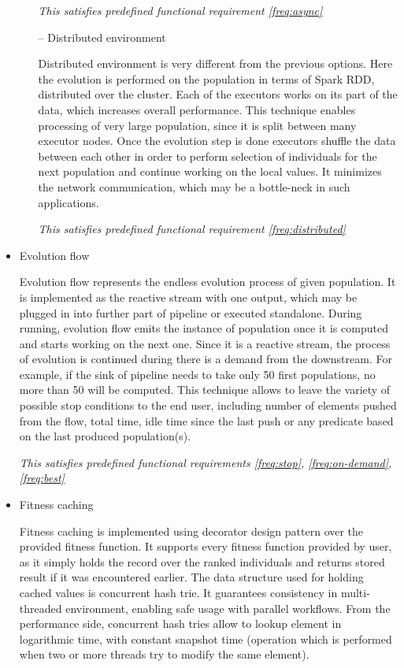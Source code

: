 \begin{itemize}
\begin{itemize}
\smallskip \textit{This satisfies predefined functional requirement \ref{freq:async}}

\medbreak

\item[--]
Distributed environment

Distributed environment is very different from the previous options. Here the evolution is performed on the population in terms of Spark RDD, distributed over the cluster. Each of the executors works on its part of the data, which increases overall performance. This technique enables processing of very large population, since it is split between many executor nodes. Once the evolution step is done executors shuffle the data between each other in order to perform selection of individuals for the next population and continue working on the local values. It minimizes the network communication, which may be a bottle-neck in such applications. 

\smallskip\textit{This satisfies predefined functional requirement \ref{freq:distributed}}

\end{itemize}
\medbreak

\item
Evolution flow

Evolution flow represents the endless evolution process of given population. It is implemented as the reactive stream with one output, which may be plugged in into further part of pipeline or executed standalone. During running, evolution flow emits the instance of population once it is computed and starts working on the next one. Since it is a reactive stream, the process of evolution is continued during there is a demand from the downstream. For example, if the sink of pipeline needs to take only 50 first populations, no more than 50 will be computed. This technique allows to leave the variety of possible stop conditions to the end user, including number of elements pushed from the flow, total time, idle time since the last push or any predicate based on the last produced population(s). 

\smallskip\textit{This satisfies predefined functional requirements \ref{freq:stop}, \ref{freq:on-demand}, \ref{freq:best}}

\medbreak

\item Fitness caching

Fitness caching is implemented using decorator design pattern over the provided fitness function. It supports every fitness function provided by user, as it simply holds the record over the ranked individuals and returns stored result if it was encountered earlier. The data structure used for holding cached values is concurrent hash trie. It guarantees consistency in multi-threaded environment, enabling safe usage with parallel workflows. From the performance side, concurrent hash tries allow to lookup element in logarithmic time, with constant snapshot time \cite{hash_tries} (operation which is performed when two or more threads try to modify the same element).


\end{itemize}
